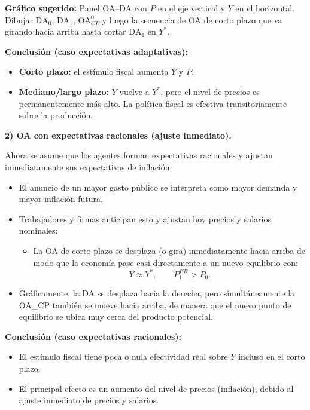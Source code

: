 \documentclass[11pt,addpoints]{article}
\begin{document}
\textbf{Gráfico sugerido:}  
Panel OA–DA con $P$ en el eje vertical y $Y$ en el horizontal. Dibujar $\text{DA}_0$, $\text{DA}_1$, $\text{OA}_{CP}^0$ y luego la secuencia de OA de corto plazo que va girando hacia arriba hasta cortar $\text{DA}_1$ en $Y^*$.

\medskip
\textbf{Conclusión (caso expectativas adaptativas):}
\begin{itemize}
  \item \textbf{Corto plazo:} el estímulo fiscal aumenta $Y$ y $P$.
  \item \textbf{Mediano/largo plazo:} $Y$ vuelve a $Y^*$, pero el nivel de precios es permanentemente más alto. La política fiscal es efectiva transitoriamente sobre la producción.
\end{itemize}

\bigskip
\textbf{2) OA con expectativas racionales (ajuste inmediato).}

Ahora se asume que los agentes forman expectativas racionales y ajustan inmediatamente sus expectativas de inflación.

\begin{itemize}
  \item El anuncio de un mayor gasto público se interpreta como mayor demanda y mayor inflación futura.
  \newpage
  \vspace*{0.5cm}
  \item Trabajadores y firmas anticipan esto y ajustan hoy precios y salarios nominales:
  \begin{itemize}
    \item La OA de corto plazo se desplaza (o gira) inmediatamente hacia arriba de modo que la economía pase casi directamente a un nuevo equilibrio con:
    \[
      Y \approx Y^*, \qquad P_1^{ER} > P_0.
    \]
  \end{itemize}
  \item Gráficamente, la DA se desplaza hacia la derecha, pero simultáneamente la OA\_CP también se mueve hacia arriba, de manera que el nuevo punto de equilibrio se ubica muy cerca del producto potencial.
\end{itemize}

\textbf{Conclusión (caso expectativas racionales):}
\begin{itemize}
  \item El estímulo fiscal tiene poca o nula efectividad real sobre $Y$ incluso en el corto plazo.
  \item El principal efecto es un aumento del nivel de precios (inflación), debido al ajuste inmediato de precios y salarios.
\end{itemize}
\end{document}
